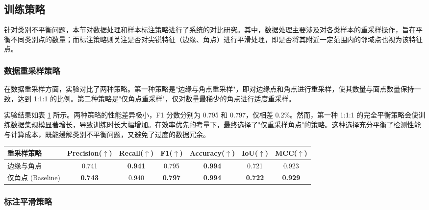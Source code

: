 \subsection{训练策略}

针对类别不平衡问题，本节对数据处理和样本标注策略进行了系统的对比研究。其中，数据处理主要涉及对各类样本的重采样操作，旨在平衡不同类别点的数量；而标注策略则关注是否对尖锐特征（边缘、角点）进行平滑处理，即是否将其附近一定范围内的邻域点也视为该特征点。

\subsubsection{数据重采样策略}

在数据重采样方面，实验对比了两种策略。第一种策略是"边缘与角点重采样"，即对边缘点和角点进行重采样，使其数量与面点数量保持一致，达到 1:1:1 的比例。第二种策略是"仅角点重采样"，仅对数量最稀少的角点进行适度重采样。

实验结果如表 \ref{tab:resampling_strategy} 所示。两种策略的性能差异极小，F1 分数分别为 0.795 和 0.797，仅相差 0.2\%。然而，第一种 1:1:1 的完全平衡策略会使训练数据集规模显著增长，导致训练时长大幅增加。在效率优先的考量下，最终选择了"仅重采样角点"的策略。这种选择充分平衡了检测性能与计算成本，既能缓解类别不平衡问题，又避免了过度的数据冗余。

\begin{table}[ht]
    \centering
    \small
    \setlength{\tabcolsep}{8pt}
    \label{tab:resampling_strategy}
    \begin{tabular}{lcccccc}
            \toprule
            重采样策略 & Precision($\uparrow$) & Recall($\uparrow$) & F1($\uparrow$)& Accuracy($\uparrow$)& IoU($\uparrow$)& MCC($\uparrow$)\\
            \midrule
            边缘与角点 & 0.741& \textbf{0.941}& 0.795& \textbf{0.994}& 0.721& 0.923\\
            仅角点 (Baseline) & \textbf{0.743}& 0.940& \textbf{0.797}& \textbf{0.994}& \textbf{0.722}& \textbf{0.929}\\
            \bottomrule
        \end{tabular}
\end{table}

\subsubsection{标注平滑策略}

